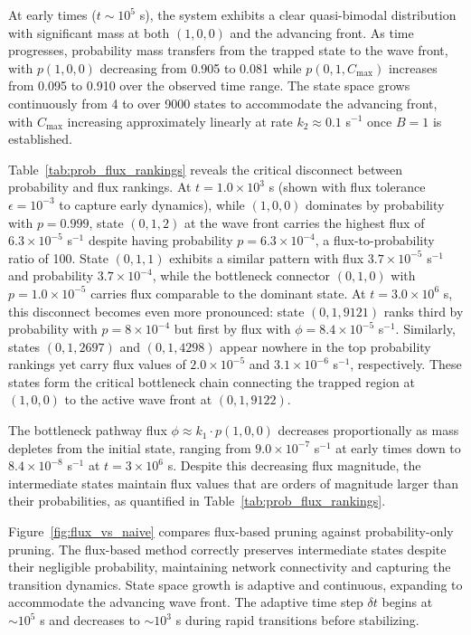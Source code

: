 \documentclass[onefignum,onetabnum]{siamart171218}
\begin{document}
At early times ($t \sim 10^5$ s), the system exhibits a clear quasi-bimodal distribution with significant mass at both $(1,0,0)$ and the advancing front. As time progresses, probability mass transfers from the trapped state to the wave front, with $p(1,0,0)$ decreasing from 0.905 to 0.081 while $p(0,1,C_{\max})$ increases from 0.095 to 0.910 over the observed time range. The state space grows continuously from 4 to over 9000 states to accommodate the advancing front, with $C_{\max}$ increasing approximately linearly at rate $k_2 \approx 0.1$ s$^{-1}$ once $B=1$ is established.

Table~\ref{tab:prob_flux_rankings} reveals the critical disconnect between probability and flux rankings. At $t=1.0\times10^3$ s (shown with flux tolerance $\epsilon=10^{-3}$ to capture early dynamics), while $(1,0,0)$ dominates by probability with $p=0.999$, state $(0,1,2)$ at the wave front carries the highest flux of $6.3\times10^{-5}$ s$^{-1}$ despite having probability $p=6.3\times10^{-4}$, a flux-to-probability ratio of 100. State $(0,1,1)$ exhibits a similar pattern with flux $3.7\times10^{-5}$ s$^{-1}$ and probability $3.7\times10^{-4}$, while the bottleneck connector $(0,1,0)$ with $p=1.0\times10^{-5}$ carries flux comparable to the dominant state. At $t=3.0\times10^6$ s, this disconnect becomes even more pronounced: state $(0,1,9121)$ ranks third by probability with $p=8\times10^{-4}$ but first by flux with $\phi=8.4\times10^{-5}$ s$^{-1}$. Similarly, states $(0,1,2697)$ and $(0,1,4298)$ appear nowhere in the top probability rankings yet carry flux values of $2.0\times10^{-5}$ and $3.1\times10^{-6}$ s$^{-1}$, respectively. These states form the critical bottleneck chain connecting the trapped region at $(1,0,0)$ to the active wave front at $(0,1,9122)$.

The bottleneck pathway flux $\phi \approx k_1 \cdot p(1,0,0)$ decreases proportionally as mass depletes from the initial state, ranging from $9.0 \times 10^{-7}$ s$^{-1}$ at early times down to $8.4 \times 10^{-8}$ s$^{-1}$ at $t = 3 \times 10^6$ s. Despite this decreasing flux magnitude, the intermediate states maintain flux values that are orders of magnitude larger than their probabilities, as quantified in Table~\ref{tab:prob_flux_rankings}.

Figure~\ref{fig:flux_vs_naive} compares flux-based pruning against probability-only pruning. The flux-based method correctly preserves intermediate states despite their negligible probability, maintaining network connectivity and capturing the transition dynamics. State space growth is adaptive and continuous, expanding to accommodate the advancing wave front. The adaptive time step $\delta t$ begins at $\sim 10^5$ s and decreases to $\sim 10^3$ s during rapid transitions before stabilizing.
\end{document}
